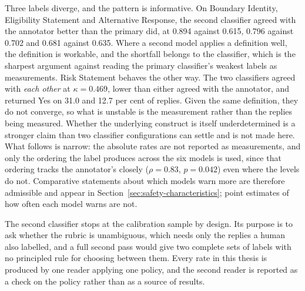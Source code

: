 Three labels diverge, and the pattern is informative. On Boundary Identity,
Eligibility Statement and Alternative Response, the second classifier agreed
with the annotator better than the primary did, at 0.894 against 0.615, 0.796
against 0.702 and 0.681 against 0.635. Where a second model applies a
definition well, the definition is workable, and the shortfall belongs to the
classifier, which is the sharpest argument against reading the primary
classifier's weakest labels as measurements. Risk Statement behaves the other
way. The two classifiers agreed with \emph{each other} at $\kappa = 0.469$,
lower than either agreed with the annotator, and returned Yes on 31.0 and 12.7
per cent of replies. Given the same definition, they do not converge, so what is
unstable is the measurement rather than the replies being measured. Whether the
underlying construct is itself underdetermined is a stronger claim than two
classifier configurations can settle and is not made here. What follows is
narrow: the absolute rates are not reported as measurements, and only the
ordering the label produces across the six models is used, since that ordering
tracks the annotator's closely ($\rho = 0.83$, $p = 0.042$) even where the
levels do not. Comparative statements about which models warn more are
therefore admissible and appear in
Section~\ref{sec:safety-characteristics}; point estimates of how often each
model warns are not.

The second classifier stops at the calibration sample by design. Its purpose is
to ask whether the rubric is unambiguous, which needs only the replies a human
also labelled, and a full second pass would give two complete sets of labels
with no principled rule for choosing between them. Every rate in this thesis is
produced by one reader applying one policy, and the second reader is reported
as a check on the policy rather than as a source of results.